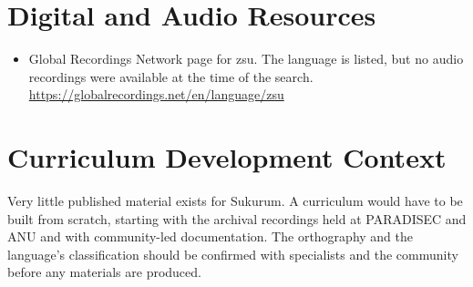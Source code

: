 \documentclass[12pt]{article}
\begin{document}
\section{Digital and Audio Resources}
\begin{itemize}
\item Global Recordings Network page for zsu. The language is listed, but no audio recordings were available at the time of the search. \url{https://globalrecordings.net/en/language/zsu}
\end{itemize}

\section{Curriculum Development Context}
Very little published material exists for Sukurum. A curriculum would have to be built from scratch, starting with the archival recordings held at PARADISEC and ANU and with community-led documentation. The orthography and the language's classification should be confirmed with specialists and the community before any materials are produced.
\end{document}
